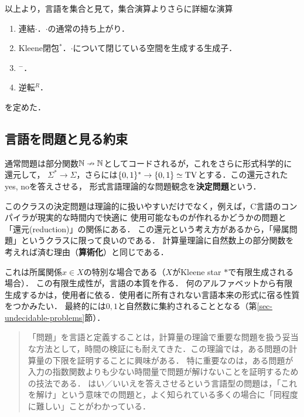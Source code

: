\documentclass[uplatex, dvipdfmx]{jsreport}
\begin{document}
\begin{screen}
    以上より，言語を集合と見て，集合演算よりさらに詳細な演算
    \begin{enumerate}
        \item 連結$\cdot$．$\cdot$の通常の持ち上がり．
        \item Kleene閉包${}^*$．$\cdot$について閉じている空間を生成する生成子．
        \item ${}^-$．
        \item 逆転${}^R$．
    \end{enumerate}
    を定めた．
\end{screen}

\subsection{言語を問題と見る約束}

\begin{tcolorbox}[colframe=ForestGreen, colback=ForestGreen!10!white, breakable]
    通常問題は部分関数$\mathbb{N}\nrightarrow\mathbb{N}$としてコードされるが，これをさらに形式科学的に還元して，
    $\Sigma^*\to\Sigma$，さらには$\{0,1\}^*\to\{0,1\}\simeq\mathrm{TV}$とする．この還元されたyes, noを答えさせる，
    形式言語理論的な問題観念を\textbf{決定問題}という．

    このクラスの決定問題は理論的に扱いやすいだけでなく，例えば，C言語のコンパイラが現実的な時間内で快適に
    使用可能なものが作れるかどうかの問題と「還元(reduction)」の関係にある．
    この還元という考え方があるから，「帰属問題」というクラスに限って良いのである．
    計算量理論に自然数上の部分関数を考えれば済む理由（\textbf{算術化}）と同じである．

    これは所属関係$x\in X$の特別な場合である（$X$がKleene star $*$で有限生成される場合）．
    この有限生成性が，言語の本質を作る．
    何のアルファベットから有限生成するかは，使用者に依る．使用者に所有されない言語本来の形式に宿る性質をつかみたい．
    最終的には$0,1$と自然数に集約されることとなる（第\ref{sec-undecidable-problems}節）．
    \begin{quotation}
        「問題」を言語と定義することは，計算量の理論で重要な問題を扱う妥当な方法として，時間の検証にも耐えてきた．この理論では，ある問題の計算量の下限を証明することに興味がある．
        特に重要なのは，ある問題が入力の指数関数よりも少ない時間量で問題が解けないことを証明するための技法である．
        はい／いいえを答えさせるという言語型の問題は，「これを解け」という意味での問題と，よく知られている多くの場合に「同程度に難しい」ことがわかっている．
    \end{quotation}
\end{tcolorbox}
\end{document}
